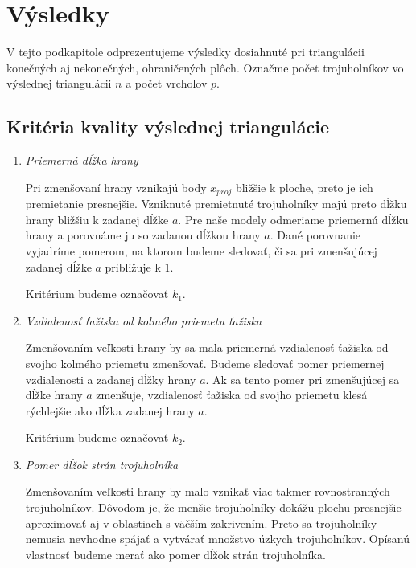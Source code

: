 \renewcommand{\arraystretch}{1}
\setlength{\fboxsep}{2mm} %
\setlength{\tabcolsep}{-4pt}

\chapter{Výsledky}
\label{kap:results}

V tejto podkapitole odprezentujeme výsledky dosiahnuté pri triangulácii konečných aj 
nekonečných, ohraničených plôch. Označme počet trojuholníkov vo výslednej triangulácii 
$n$ a počet vrcholov $p$.

\section{Kritéria kvality výslednej triangulácie}
\begin{enumerate}
\item{
    \textit{Priemerná dĺžka hrany}

    Pri zmenšovaní hrany vznikajú body $x_{proj}$ bližšie k ploche, preto je ich premietanie
    presnejšie. Vzniknuté premietnuté trojuholníky majú preto dĺžku hrany bližšiu k zadanej dĺžke 
    $a$. Pre naše modely odmeriame priemernú dĺžku hrany a porovnáme ju so zadanou dĺžkou hrany $a$. 
    Dané porovnanie vyjadríme 
    pomerom, na ktorom budeme sledovať, či sa pri zmenšujúcej zadanej dĺžke $a$ približuje k $1$.

    Kritérium budeme označovať $k_1$.
}
\item{
    \textit{Vzdialenosť ťažiska od kolmého priemetu ťažiska}

    Zmenšovaním veľkosti hrany by sa mala priemerná vzdialenosť ťažiska od svojho kolmého 
    priemetu zmenšovať. Budeme sledovať pomer priemernej 
    vzdialenosti a zadanej dĺžky hrany $a$. Ak sa tento pomer pri zmenšujúcej sa dĺžke hrany 
    $a$ zmenšuje, vzdialenosť
    ťažiska od svojho priemetu klesá rýchlejšie ako dĺžka zadanej hrany $a$.

    Kritérium budeme označovať $k_2$.
}
\item{
    \textit{Pomer dĺžok strán trojuholníka}

    Zmenšovaním veľkosti hrany by malo vznikať viac takmer rovnostranných trojuholníkov.
    Dôvodom je, že menšie trojuholníky dokážu plochu presnejšie aproximovať aj v oblastiach 
    s väčším zakrivením. Preto sa trojuholníky nemusia nevhodne spájať a vytvárať množstvo 
    úzkych trojuholníkov. Opísanú vlastnosť budeme merať ako pomer dĺžok strán trojuholníka. 

}
\end{enumerate}
